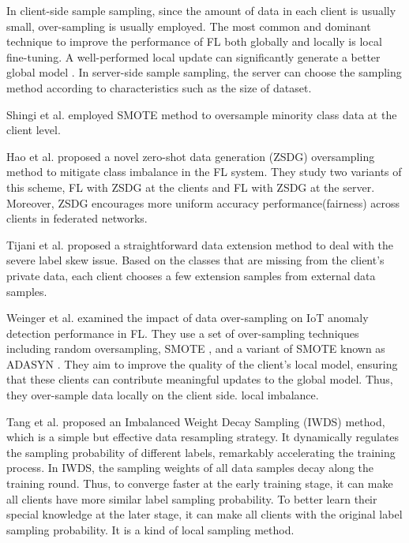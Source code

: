 \documentclass[10pt,journal,compsoc]{IEEEtran}
\begin{document}
	In client-side sample sampling, since the amount of data in each client is usually small, over-sampling is usually employed. The most common and dominant technique to improve the performance of FL both globally and locally is local fine-tuning. A well-performed local update can significantly generate a better global model \cite{ran2021dynamic}. In server-side sample sampling, the server can choose the sampling method according to characteristics such as the size of dataset.
	
	Shingi et al. \cite{shingi2020federated} employed SMOTE method to oversample minority class data at the client level. 
	
	Hao et al. \cite{hao2021towards} proposed a novel zero-shot data generation (ZSDG) oversampling method to mitigate class imbalance in the FL system. They study two variants of this scheme, FL with ZSDG at the clients and FL with ZSDG at the server. Moreover, ZSDG encourages more uniform accuracy performance(fairness) across clients in federated networks. 
	
	Tijani et al. \cite{tijani2021federated} proposed a straightforward data extension method to deal with the severe label skew issue. Based on the classes that are missing from the client's private data, each client chooses a few extension samples from external data samples.
	
	Weinger et al. \cite{weinger2022enhancing} examined the impact of data over-sampling on IoT anomaly detection performance in FL. They use a set of over-sampling techniques including random oversampling, SMOTE \cite{chawla2002smote}, and a variant of SMOTE known as ADASYN \cite{he2008adaptive}. They aim to improve the quality of the client's local model, ensuring that these clients can contribute meaningful updates to the global model. Thus, they over-sample data locally on the client side.  local imbalance.
	
	Tang et al. \cite{tangdata} proposed an Imbalanced Weight Decay Sampling (IWDS) method, which is a simple but effective data resampling strategy. It dynamically regulates the sampling probability of different labels, remarkably accelerating the training process. In IWDS, the sampling weights of all data samples decay along the training round. Thus, to converge faster at the early training stage, it can make all clients have more similar label sampling probability. To better learn their special knowledge at the later stage, it can make all clients with the original label sampling probability. It is a kind of local sampling method.
	
\end{document}
